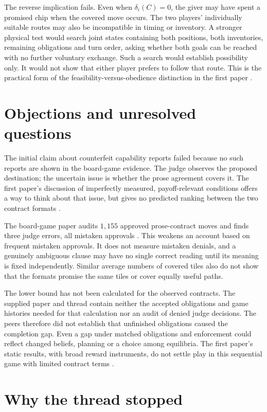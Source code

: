 \documentclass{article}
\begin{document}
The reverse implication fails. Even when \(\delta_i(C)=0\), the giver may have spent a promised chip when the
covered move occurs. The two players' individually suitable routes may also be incompatible in timing or
inventory. A stronger physical test would search joint states containing both positions, both inventories,
remaining obligations and turn order, asking whether both goals can be reached with no further voluntary
exchange. Such a search would establish possibility only. It would not show that either player prefers to
follow that route. This is the practical form of the feasibility-versus-obedience distinction in the first
paper \cite{Q}.

\section{Objections and unresolved questions}

The initial claim about counterfeit capability reports failed because no such reports are shown in the
board-game evidence. The judge observes the proposed destination; the uncertain issue is whether the prose
agreement covers it. The first paper's discussion of imperfectly measured, payoff-relevant conditions offers a
way to think about that issue, but gives no predicted ranking between the two contract formats \cite{Q}.

The board-game paper audits \(1{,}155\) approved prose-contract moves and finds three judge errors, all
mistaken approvals \cite{P}. This weakens an account based on frequent mistaken approvals. It does not measure
mistaken denials, and a genuinely ambiguous clause may have no single correct reading until its meaning is
fixed independently. Similar average numbers of covered tiles also do not show that the formats promise the
same tiles or cover equally useful paths.

The lower bound has not been calculated for the observed contracts. The supplied paper and thread contain
neither the accepted obligations and game histories needed for that calculation nor an audit of denied judge
decisions. The peers therefore did not establish that unfinished obligations caused the completion gap. Even a
gap under matched obligations and enforcement could reflect changed beliefs, planning or a choice among
equilibria. The first paper's static results, with broad reward instruments, do not settle play in this
sequential game with limited contract terms \cite{Q,P}.

\section{Why the thread stopped}
\end{document}
